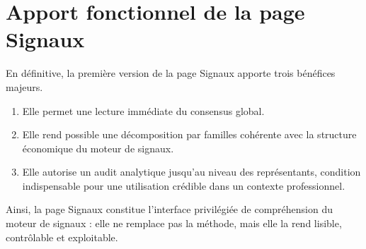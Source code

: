 \section{Apport fonctionnel de la page Signaux}
En définitive, la première version de la page Signaux apporte trois bénéfices
majeurs.
\begin{enumerate}
\item Elle permet une lecture immédiate du consensus global.
\item Elle rend possible une décomposition par familles cohérente avec la
structure économique du moteur de signaux.
\item Elle autorise un audit analytique jusqu'au niveau des représentants,
condition indispensable pour une utilisation crédible dans un contexte
professionnel.
\end{enumerate}

Ainsi, la page Signaux constitue l'interface privilégiée de compréhension du
moteur de signaux : elle ne remplace pas la méthode, mais elle la rend lisible,
contrôlable et exploitable.
